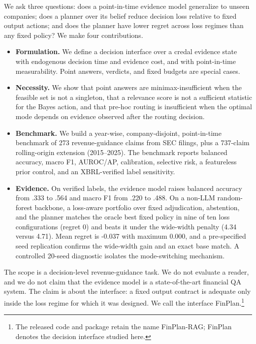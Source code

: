 \documentclass[11pt]{article}
\newcommand{\method}{FinPlan}
\begin{document}
We ask three questions: does a point-in-time evidence model generalize to unseen companies; does a planner over its belief reduce decision loss relative to fixed output actions; and does the planner have lower regret across loss regimes than any fixed policy? We make four contributions.
\begin{itemize}[leftmargin=*,itemsep=1pt,topsep=2pt]
\item \textbf{Formulation.} We define a decision interface over a credal evidence state with endogenous decision time and evidence cost, and with point-in-time measurability. Point answers, verdicts, and fixed budgets are special cases.
\item \textbf{Necessity.} We show that point answers are minimax-insufficient when the feasible set is not a singleton, that a relevance score is not a sufficient statistic for the Bayes action, and that pre-hoc routing is insufficient when the optimal mode depends on evidence observed after the routing decision.
\item \textbf{Benchmark.} We build a year-wise, company-disjoint, point-in-time benchmark of 273 revenue-guidance claims from SEC filings, plus a 737-claim rolling-origin extension (2015--2025). The benchmark reports balanced accuracy, macro F1, AUROC/AP, calibration, selective risk, a featureless prior control, and an XBRL-verified label sensitivity.
\item \textbf{Evidence.} On verified labels, the evidence model raises balanced accuracy from .333 to .564 and macro F1 from .220 to .488. On a non-LLM random-forest backbone, a loss-aware portfolio over fixed adjudication, abstention, and the planner matches the oracle best fixed policy in nine of ten loss configurations (regret 0) and beats it under the wide-width penalty (4.34 versus 4.71). Mean regret is -0.037 with maximum 0.000, and a pre-specified seed replication confirms the wide-width gain and an exact base match. A controlled 20-seed diagnostic isolates the mode-switching mechanism.
\end{itemize}

The scope is a decision-level revenue-guidance task. We do not evaluate a reader, and we do not claim that the evidence model is a state-of-the-art financial QA system. The claim is about the interface: a fixed output contract is adequate only inside the loss regime for which it was designed. We call the interface \method.\footnote{The released code and package retain the name FinPlan-RAG; \method{} denotes the decision interface studied here.}
\end{document}
